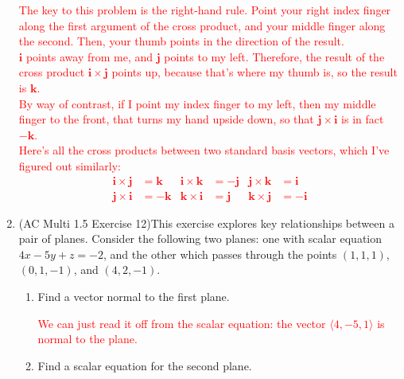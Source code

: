 \documentclass[10pt]{article}
\newcommand{\vi}{\mathbf{i}}
\newcommand{\vj}{\mathbf{j}}
\newcommand{\vk}{\mathbf{k}}
\newcommand{\red}[1]{ %
	\textcolor{red}{#1} }%
\begin{document}
\begin{enumerate}[leftmargin=0pt]
		\red{
			The key to this problem is the right-hand rule. Point your right index finger along the first argument of the cross product, and your middle finger along the second. Then, your thumb points in the direction of the result.\\
			$\vi$ points away from me, and $\vj$ points to my left. Therefore, the result of the cross product $\vi\times\vj$ points up, because that's where my thumb is, so the result is $\vk$.\\
			By way of contrast, if I point my index finger to my left, then my middle finger to the front, that turns my hand upside down, so that $\vj\times\vi$ is in fact $-\vk$.\\
			Here's all the cross products between two standard basis vectors, which I've figured out similarly: 
			\begin{align*}
				\vi\times\vj &=  \vk & \vi \times \vk &= -\vj & \vj \times\vk &= \vi \\
				\vj\times\vi &= -\vk & \vk \times \vi &=  \vj & \vk \times\vj &= -\vi
			\end{align*}
		}
	
	\item (AC Multi 1.5 Exercise 12)This exercise explores key relationships between a pair of planes. Consider the following two planes: one with scalar equation $4x-5y+z = -2$, and the other which passes through the points $(1,1,1)$, $(0, 1, -1)$, and $(4, 2, -1)$.
	\begin{enumerate}
		\item Find a vector normal to the first plane.
		
		\red{
			We can just read it off from the scalar equation: the vector $\langle 4, -5, 1\rangle$ is normal to the plane.
		}
		\item Find a scalar equation for the second plane.
		

\end{enumerate}
\end{enumerate}
\end{document}
